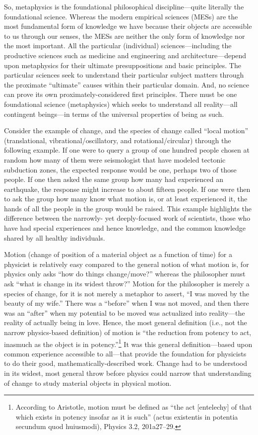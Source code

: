 So, metaphysics is the foundational philosophical discipline---quite literally the foundational science. Whereas the modern empirical sciences (MESs) are the most fundamental form of knowledge we have because their objects are accessible to us through our senses, the MESs are neither the only form of knowledge nor the most important. All the particular (individual) sciences---including the productive sciences such as medicine and engineering and architecture---depend upon metaphysics for their ultimate presuppositions and basic principles. The particular sciences seek to understand their particular subject matters through the proximate ``ultimate'' causes within their particular domain. And, no science can prove its own proximately-considered first principles. There must be one foundational science (metaphysics) which seeks to understand all reality---all contingent beings---in terms of the universal properties of being as such.

Consider the example of change, and the species of change called ``local motion'' (translational, vibrational/oscillatory, and rotational/circular) through the following example. If one were to query a group of one hundred people chosen at random how many of them were seismologist that have modeled tectonic subduction zones, the expected response would be one, perhaps two of those people. If one then asked the same group how many had experienced an earthquake, the response might increase to about fifteen people. If one were then to ask the group how many know what motion is, or at least experienced it, the hands of all the people in the group would be raised. This example highlights the difference between the narrowly- yet deeply-focused work of scientists, those who have had special experiences and hence knowledge, and the common knowledge shared by all healthy individuals.

Motion (change of position of a material object as a function of time) for a physicist is relatively easy compared to the general notion of what motion is, for physics only asks ``how do things change/move?'' whereas the philosopher must ask ``what is change in its widest throw?'' Motion for the philosopher is merely a species of change, for it is not merely a metaphor to assert, ``I was moved by the beauty of my wife.'' There was a ``before'' when I was not moved, and then there was an ``after'' when my potential to be moved was actualized into reality---the reality of actually being in love. Hence, the most general definition (i.e., not the narrow physics-based definition) of motion is ``the reduction from potency to act, inasmuch as the object is in potency.''\footnote{According to Aristotle, motion must be defined as ``the act [entelechy] of that which exists in potency insofar as it is such'' (actus existentis in potentia secundum quod huiusmodi), Physics 3.2, 201a27–29.} It was this general definition---based upon common experience accessible to all---that provide the foundation for physicists to do their good, mathematically-described work. Change had to be understood in its widest, most general throw before physics could narrow that understanding of change to study material objects in physical motion.

